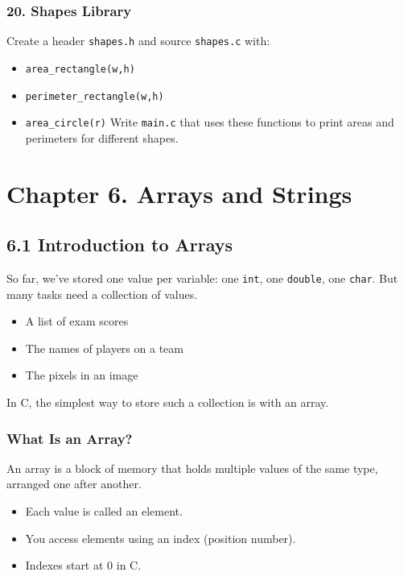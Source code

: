 \documentclass[
  letterpaper,
  DIV=11,
  numbers=noendperiod]{scrreprt}
\providecommand{\tightlist}{%
  \setlength{\itemsep}{0pt}\setlength{\parskip}{0pt}}
\begin{document}
\subsubsection{20. Shapes Library}\label{shapes-library}

Create a header \texttt{shapes.h} and source \texttt{shapes.c} with:

\begin{itemize}
\tightlist
\item
  \texttt{area\_rectangle(w,h)}
\item
  \texttt{perimeter\_rectangle(w,h)}
\item
  \texttt{area\_circle(r)} Write \texttt{main.c} that uses these
  functions to print areas and perimeters for different shapes.
\end{itemize}

\section{Chapter 6. Arrays and
Strings}\label{chapter-6.-arrays-and-strings}

\subsection{6.1 Introduction to Arrays}\label{introduction-to-arrays}

So far, we've stored one value per variable: one \texttt{int}, one
\texttt{double}, one \texttt{char}. But many tasks need a collection of
values.

\begin{itemize}
\tightlist
\item
  A list of exam scores
\item
  The names of players on a team
\item
  The pixels in an image
\end{itemize}

In C, the simplest way to store such a collection is with an array.

\subsubsection{What Is an Array?}\label{what-is-an-array}

An array is a block of memory that holds multiple values of the same
type, arranged one after another.

\begin{itemize}
\tightlist
\item
  Each value is called an element.
\item
  You access elements using an index (position number).
\item
  Indexes start at 0 in C.
\end{itemize}
\end{document}
